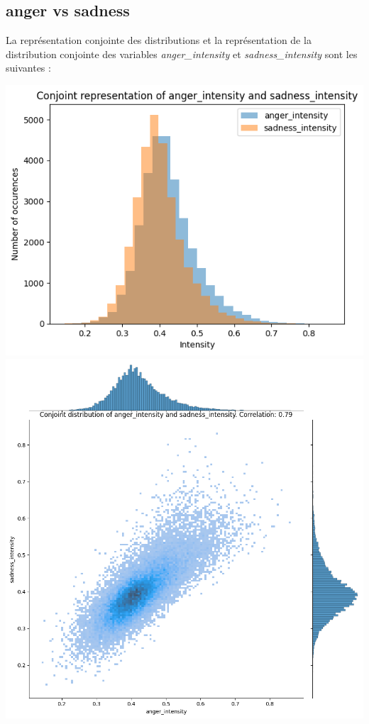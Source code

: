 \documentclass{article}
\begin{document}
\subsection*{anger vs sadness}

La représentation conjointe des distributions et la représentation de la
distribution conjointe des variables
\textit{anger\_intensity} et \textit{sadness\_intensity}
sont les suivantes :

\begin{center}
    \includegraphics[scale=0.39]{./img/conjoint_representation_anger_intensity_sadness_intensity.png}
    \includegraphics[scale=0.23]{./img/conjoint_distribution_anger_intensity_sadness_intensity.png}
\end{center}
\end{document}
